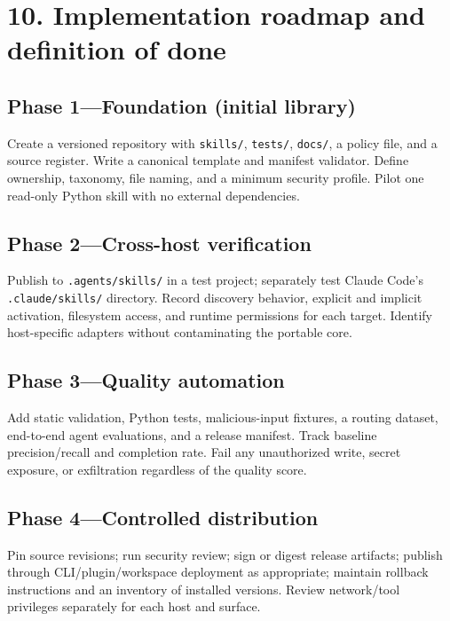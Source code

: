 \documentclass[
  10pt,
  letterpaper,
]{article}
\newcommand{\passthrough}[1]{#1}
\begin{document}
\section{10. Implementation roadmap and definition of
done}\label{implementation-roadmap-and-definition-of-done}

\subsection{Phase 1---Foundation (initial
library)}\label{phase-1foundation-initial-library}

Create a versioned repository with \passthrough{\lstinline!skills/!},
\passthrough{\lstinline!tests/!}, \passthrough{\lstinline!docs/!}, a
policy file, and a source register. Write a canonical template and
manifest validator. Define ownership, taxonomy, file naming, and a
minimum security profile. Pilot one read-only Python skill with no
external dependencies.

\subsection{Phase 2---Cross-host
verification}\label{phase-2cross-host-verification}

Publish to \passthrough{\lstinline!.agents/skills/!} in a test project;
separately test Claude Code's \passthrough{\lstinline!.claude/skills/!}
directory. Record discovery behavior, explicit and implicit activation,
filesystem access, and runtime permissions for each target. Identify
host-specific adapters without contaminating the portable core.

\subsection{Phase 3---Quality
automation}\label{phase-3quality-automation}

Add static validation, Python tests, malicious-input fixtures, a routing
dataset, end-to-end agent evaluations, and a release manifest. Track
baseline precision/recall and completion rate. Fail any unauthorized
write, secret exposure, or exfiltration regardless of the quality score.

\subsection{Phase 4---Controlled
distribution}\label{phase-4controlled-distribution}

Pin source revisions; run security review; sign or digest release
artifacts; publish through CLI/plugin/workspace deployment as
appropriate; maintain rollback instructions and an inventory of
installed versions. Review network/tool privileges separately for each
host and surface.
\end{document}
